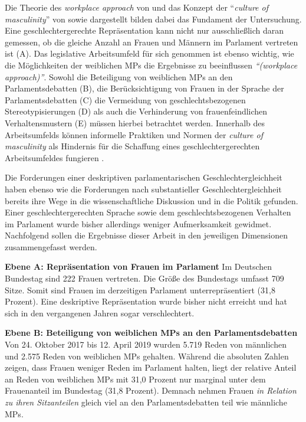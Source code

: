 \documentclass[12pt, 
    twoside=false, 
    bibliography=totoc, 
    numbers=endperiod, 
    headings=normal, 
    toc=chapterentrydotfill
    ]{scrbook}
\begin{document}
Die Theorie des \emph{workplace approach} von \textcite{erikson_2018} und das Konzept der \enquote{\emph{culture of masculinity}} von \textcite{lovenduski_2005} sowie \textcite{erikson_2018} dargestellt bilden dabei das Fundament der Untersuchung. 
Eine geschlechtergerechte Repräsentation kann nicht nur ausschließlich daran gemessen, ob die gleiche Anzahl an Frauen und Männern im Parlament vertreten ist (A). Das legislative Arbeitsumfeld für sich genommen ist ebenso wichtig, wie die Möglichkeiten der weiblichen MPs die Ergebnisse zu beeinflussen \emph{\enquote{(workplace approach)}}. Sowohl die Beteiligung von weiblichen MPs an den Parlamentsdebatten (B), die Berücksichtigung von Frauen in der Sprache der Parlamentsdebatten (C) die Vermeidung von geschlechtsbezogenen Stereotypisierungen (D) als auch die Verhinderung von frauenfeindlichen Verhaltensmustern (E) müssen hierbei betrachtet werden. Innerhalb des Arbeitsumfelds können informelle Praktiken und Normen der \emph{culture of masculinity} als Hindernis für die Schaffung eines geschlechtergerechten Arbeitsumfeldes fungieren \parencite[200]{erikson_2018}.

Die Forderungen einer deskriptiven parlamentarischen Geschlechtergleichheit haben ebenso wie die Forderungen nach substantieller Geschlechtergleichheit bereits ihre Wege in die wissenschaftliche Diskussion und in die Politik gefunden. Einer geschlechtergerechten Sprache sowie dem geschlechtsbezogenen Verhalten im Parlament wurde bisher allerdings weniger Aufmerksamkeit gewidmet. Nachfolgend sollen die Ergebnisse dieser Arbeit in den jeweiligen Dimensionen zusammengefasst werden.

\noindent
\textbf{Ebene A: Repräsentation von Frauen im Parlament}
Im Deutschen Bundestag sind 222 Frauen vertreten. Die Größe des Bundestags umfasst 709 Sitze. Somit sind Frauen im derzeitigen Parlament unterrepräsentiert (31,8 Prozent). Eine deskriptive Repräsentation wurde bisher nicht erreicht und hat sich in den vergangenen Jahren sogar verschlechtert.

\noindent
\textbf{Ebene B: Beteiligung von weiblichen MPs an den Parlamentsdebatten}
Von 24. Oktober 2017 bis 12. April 2019 wurden 5.719 Reden von männlichen und 2.575 Reden von weiblichen MPs gehalten. Während die absoluten Zahlen zeigen, dass Frauen weniger Reden im Parlament halten, liegt der relative Anteil an Reden von weiblichen MPs mit 31,0 Prozent nur marginal unter dem Frauenanteil im Bundestag (31,8 Prozent). Demnach nehmen Frauen \emph{in Relation zu ihren Sitzanteilen} gleich viel an den Parlamentsdebatten teil wie männliche MPs.
\end{document}
